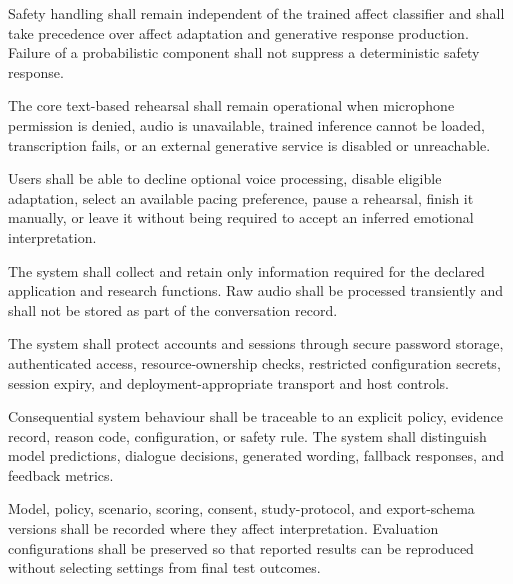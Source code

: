 \begin{description}[leftmargin=!,labelwidth=3.7cm,style=nextline]
    \item[\textbf{NFR1. Safety}]
    Safety handling shall remain independent of the trained affect classifier and shall take precedence over affect adaptation and generative response production. Failure of a probabilistic component shall not suppress a deterministic safety response.

    \item[\textbf{NFR2. Graceful degradation}]
    The core text-based rehearsal shall remain operational when microphone permission is denied, audio is unavailable, trained inference cannot be loaded, transcription fails, or an external generative service is disabled or unreachable.

    \item[\textbf{NFR3. User control}]
    Users shall be able to decline optional voice processing, disable eligible adaptation, select an available pacing preference, pause a rehearsal, finish it manually, or leave it without being required to accept an inferred emotional interpretation.

    \item[\textbf{NFR4. Privacy and data minimisation}]
    The system shall collect and retain only information required for the declared application and research functions. Raw audio shall be processed transiently and shall not be stored as part of the conversation record.

    \item[\textbf{NFR5. Security}]
    The system shall protect accounts and sessions through secure password storage, authenticated access, resource-ownership checks, restricted configuration secrets, session expiry, and deployment-appropriate transport and host controls.

    \item[\textbf{NFR6. Explainability and auditability}]
    Consequential system behaviour shall be traceable to an explicit policy, evidence record, reason code, configuration, or safety rule. The system shall distinguish model predictions, dialogue decisions, generated wording, fallback responses, and feedback metrics.

    \item[\textbf{NFR7. Reproducibility}]
    Model, policy, scenario, scoring, consent, study-protocol, and export-schema versions shall be recorded where they affect interpretation. Evaluation configurations shall be preserved so that reported results can be reproduced without selecting settings from final test outcomes.


\end{description}
